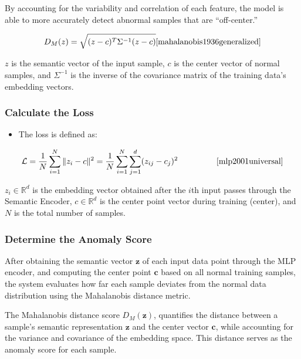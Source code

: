 \begin{ZhChapter}
    By accounting for the variability and correlation of each feature, the model is able to more accurately detect abnormal samples that are ``off-center.''




    \begin{equation}
        D_M(z) = \sqrt{(z - c)^T \Sigma^{-1} (z - c)} \tag*{\makebox[3.8cm][r]{\cite{mahalanobis1936generalized}}}
        \label{eq:mahalanobiseq}
    \end{equation}

    $z$ is the semantic vector of the input sample, $c$ is the center vector of normal samples, and $\Sigma^{-1}$ is the inverse of the covariance matrix of the training data's embedding vectors.


    \subsubsection{Calculate the Loss}
    \begin{itemize}
        \item The loss is defined as:
    \end{itemize}

    \begin{equation}
        \mathcal{L} = \frac{1}{N} \sum_{i=1}^{N} \| z_i - c \|^2
        = \frac{1}{N} \sum_{i=1}^{N} \sum_{j=1}^{d} (z_{ij} - c_j)^2 \tag*{\makebox[3.8cm][r]{\cite{mlp2001universal}}}
        \label{eq:centerloss}
    \end{equation}

    $z_i \in \mathbb{R}^d$ is the embedding vector obtained after the $i$th input passes through the Semantic Encoder,
    $c \in \mathbb{R}^d$ is the center point vector during training (center), and $N$ is the total number of samples.



    \subsubsection{Determine the Anomaly Score}
    After obtaining the semantic vector \(\mathbf{z}\) of each input data point through the MLP encoder, and computing the center point \(\mathbf{c}\) based on all normal training samples, the system evaluates how far each sample deviates from the normal data distribution using the Mahalanobis distance metric.

    The Mahalanobis distance score \(D_M(\mathbf{z})\), quantifies the distance between a sample's semantic representation \(\mathbf{z}\) and the center vector \(\mathbf{c}\), while accounting for the variance and covariance of the embedding space. This distance serves as the anomaly score for each sample.


\end{ZhChapter}
